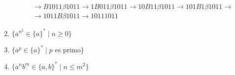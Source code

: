 \begin{ejercicio}
\begin{enumerate}
\begin{align*}
                  &\rightarrow B1011\beta1011 \rightarrow 1B011\beta1011 \rightarrow10B11\beta1011 \rightarrow 101B1\beta1011\rightarrow \\
                  &\rightarrow 1011B\beta1011 \rightarrow10111011
            \end{align*}
        \item $\{a^{n^2} \in \{a\}^{\ast} \mid n\geq 0\}$
        \item $\{a^p \in \{a\}^{\ast} \mid p \text{ es primo}\}$
        \item $\{a^nb^m \in \{a,b\}^{\ast} \mid n\leq m^2\}$
    \end{enumerate}

\end{ejercicio}

